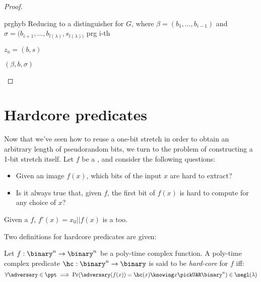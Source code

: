 \begin{proof}
    \begin{cryptoredux}
        {prghyb}
        {Reducing to a distinguisher for $G$, where $\beta = (b_1, \dots, b_{i-1})$ and $\sigma = (b_{i+1}, \dots, b_{l(\lambda)}, s_{l(\lambda))}$}
        {prg}
        {i-th}

        {$z_a = (b, s)$}{}

        \cseqdelay

        {$(\beta, b, \sigma)$}{}
        
        \cseqdelay

    
    \end{cryptoredux}

\end{proof}

\section{Hardcore predicates}

Now that we've seen how to reuse a one-bit stretch \prg{} in order to obtain an arbitrary length of pseudorandom bits, we turn to the problem of constructing a 1-bit stretch \prg{} itself. Let $f$ be a \owf{}, and consider the following questions:
\begin{itemize}
    \item Given an image $f(x)$, which bits of the input $x$ are hard to extract?
    \item Is it always true that, given $f$, the first bit of $f(x)$ is hard to compute for any choice of $x$?
\end{itemize}

\begin{example}
    Given a \owf{} $f$, $f'(x) = x_0 || f(x)$ is a \owf{} too.
\end{example}

Two definitions for hardcore predicates are given:

\begin{definition}
    Let $f : \binary^n \to \binary^n$ be a poly-time complex function. A poly-time complex predicate $\hc : \binary^n \to \binary $ is said to be \emph{hard-core} for $f$ iff:
    \[
        \forall \adversary \in \ppt \implies \Pr(\adversary(f(x)) = \hc(x) \knowing x \pickUAR \binary^n) \in \negl(\lambda) 
    \]
\end{definition}

